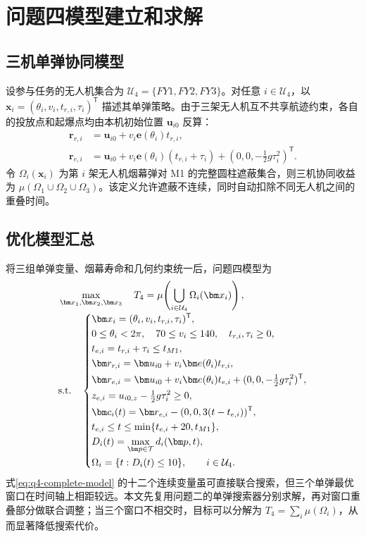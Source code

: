 \section{问题四模型建立和求解}

\subsection{三机单弹协同模型}

设参与任务的无人机集合为 $\mathcal U_4=\{FY1,FY2,FY3\}$。对任意 $i\in\mathcal U_4$，以 $\bm x_i=(\theta_i,v_i,t_{r,i},\tau_i)^{\mathsf T}$ 描述其单弹策略。由于三架无人机互不共享航迹约束，各自的投放点和起爆点均由本机初始位置 $\bm u_{i0}$ 反算：
\begin{align}
 \bm r_{r,i}&=\bm u_{i0}+v_i\bm e(\theta_i)t_{r,i},\\
 \bm r_{e,i}&=\bm u_{i0}+v_i\bm e(\theta_i)(t_{r,i}+\tau_i)
 +(0,0,-\tfrac12g\tau_i^2)^{\mathsf T}.
\end{align}
令 $\Omega_i(\bm x_i)$ 为第 $i$ 架无人机烟幕弹对 M1 的完整圆柱遮蔽集合，则三机协同收益为 $\mu(\Omega_1\cup\Omega_2\cup\Omega_3)$。该定义允许遮蔽不连续，同时自动扣除不同无人机之间的重叠时间。

\subsection{优化模型汇总}

将三组单弹变量、烟幕寿命和几何约束统一后，问题四模型为
\begin{equation}
\begin{aligned}
&\max_{\bm x_1,\bm x_2,\bm x_3}\quad
T_4=\mu\!\left(\bigcup_{i\in\mathcal U_4}\Omega_i(\bm x_i)\right),\\[-1mm]
&\text{\rm s.t.}\quad
\left\{\begin{aligned}
&\bm x_i=(\theta_i,v_i,t_{r,i},\tau_i)^{\mathsf T},\\
&0\le\theta_i<2\pi,\quad 70\le v_i\le140,\quad t_{r,i},\tau_i\ge0,\\
&t_{e,i}=t_{r,i}+\tau_i\le t_{M1},\\
&\bm r_{r,i}=\bm u_{i0}+v_i\bm e(\theta_i)t_{r,i},\\
&\bm r_{e,i}=\bm u_{i0}+v_i\bm e(\theta_i)t_{e,i}
 +(0,0,-\tfrac12g\tau_i^2)^{\mathsf T},\\
&z_{e,i}=u_{i0,z}-\tfrac12g\tau_i^2\ge0,\\
&\bm c_i(t)=\bm r_{e,i}-(0,0,3(t-t_{e,i}))^{\mathsf T},\\
&t_{e,i}\le t\le\min\{t_{e,i}+20,t_{M1}\},\\
&D_i(t)=\displaystyle\max_{\bm p\in\mathcal T}d_i(\bm p,t),\\
&\Omega_i=\{t:D_i(t)\le10\},\qquad i\in\mathcal U_4.
\end{aligned}\right.
\end{aligned}
\label{eq:q4-complete-model}
\end{equation}
式\cref{eq:q4-complete-model} 的十二个连续变量虽可直接联合搜索，但三个单弹最优窗口在时间轴上相距较远。本文先复用问题二的单弹搜索器分别求解，再对窗口重叠部分做联合调整；当三个窗口不相交时，目标可以分解为 $T_4=\sum_i\mu(\Omega_i)$，从而显著降低搜索代价。


